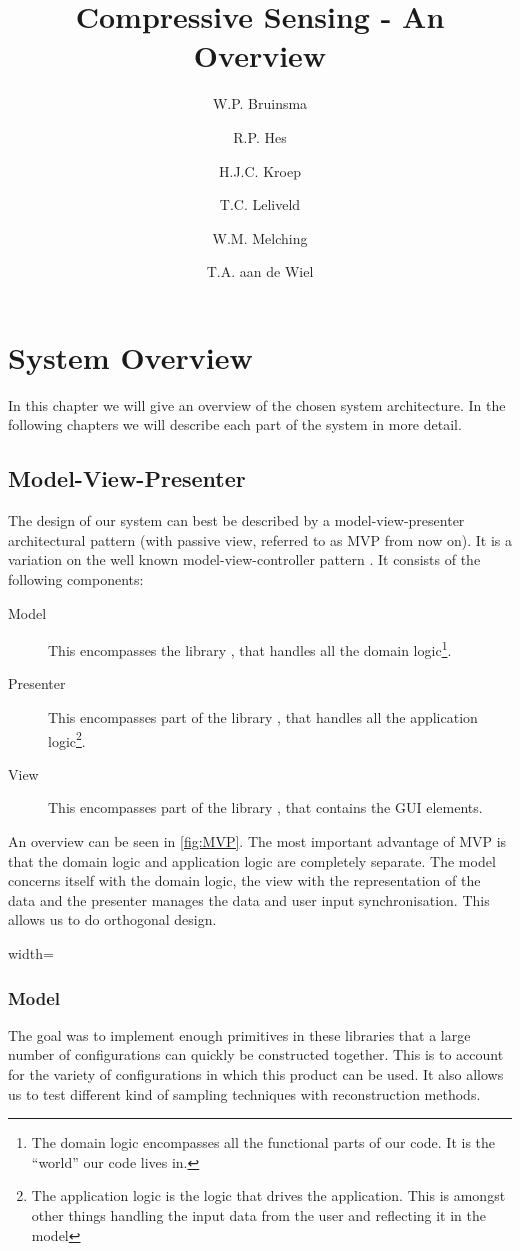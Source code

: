 \documentclass[a4paper, openany, oneside]{memoir}
\title{Compressive Sensing - An Overview}
\author{W.P. Bruinsma \and R.P. Hes \and H.J.C. Kroep \and T.C. Leliveld \and W.M. Melching \and T.A. aan de Wiel}
\begin{document}
\chapter{System Overview}
In this chapter we will give an overview of the chosen system architecture. In the following chapters we will describe each part of the system in more detail.

\section{Model-View-Presenter}
\label{sec:model-view-presenter}
The design of our system can best be described by a model-view-presenter architectural pattern (with passive view, referred to as MVP from now on). It is a variation on the well known model-view-controller pattern \cite{syromiatnikov2014journey}. It consists of the following components:
\begin{description}
    \item[Model] This encompasses the library , that handles all the domain logic\footnote{The domain logic encompasses all the functional parts of our code. It is the ``world'' our code lives in.}.
    \item[Presenter] This encompasses part of the library , that handles all the application logic\footnote{The application logic is the logic that drives the application. This is amongst other things handling the input data from the user and reflecting it in the model}.
    \item[View] This encompasses part of the library , that contains the GUI elements.
\end{description}
An overview can be seen in \cref{fig:MVP}. The most important advantage of MVP is that the domain logic and application logic are completely separate. The model concerns itself with the domain logic, the view with the representation of the data and the presenter manages the data and user input synchronisation. This allows us to do orthogonal design.

\begin{figure*}
    \centering
	\begin{adjustbox}{width=\textwidth}
    
    \end{adjustbox}
    \caption{Illustration of the MVP pattern as an hierarchical way of separating our system.}
    \label{fig:MVP}
\end{figure*}

\subsection{Model}
\label{sub:model}
The goal was to implement enough primitives in these libraries that a large number of configurations can quickly be constructed together. This is to account for the variety of configurations in which this product can be used. It also allows us to test different kind of sampling techniques with reconstruction methods.
\end{document}
